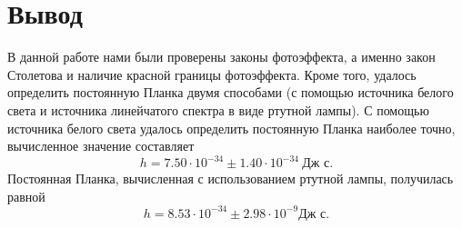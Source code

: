 \documentclass[12pt]{article}
\begin{document}
	 \section{Вывод}
	 В данной работе нами были проверены законы фотоэффекта, а именно закон Столетова и наличие красной границы фотоэффекта. Кроме того, удалось определить постоянную Планка двумя способами (с помощью источника белого света и источника линейчатого спектра в виде ртутной лампы). С помощью источника белого света удалось определить постоянную Планка наиболее точно, вычисленное значение составляет
	 \begin{equation}
	 	h = 7.50 \cdot 10^{-34} \pm 1.40 \cdot 10^{-34}\ \text{Дж с}.
	 \end{equation}
	 Постоянная Планка, вычисленная с использованием ртутной лампы, получилась равной
	 \begin{equation}
	  	h = 8.53 \cdot 10^{-34} \pm 2.98 \cdot 10^{-9} \text{Дж с}.
	  \end{equation} 
\end{document}
